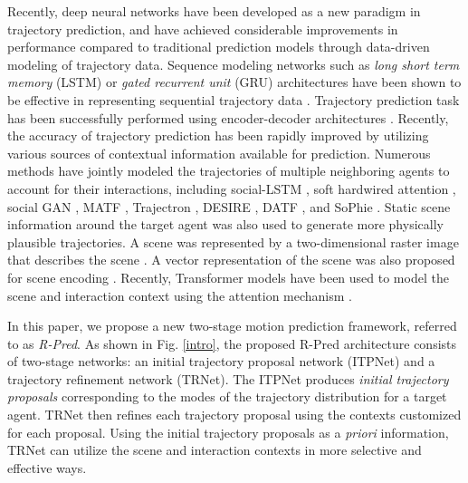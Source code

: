 \documentclass[10pt,twocolumn,letterpaper]{article}
\begin{document}
Recently, deep neural networks have been developed as a new paradigm in trajectory prediction, and have achieved considerable improvements in performance compared to traditional prediction models through data-driven modeling of trajectory data.  Sequence modeling networks such as {\it long short term memory} (LSTM) \cite{LSTM} or {\it gated recurrent unit} (GRU) \cite{GRU} architectures have been shown to be effective in representing sequential trajectory data \cite{LSTM_bdkim, LaPred}. Trajectory prediction task has been successfully performed using encoder-decoder architectures  \cite{seq2seq, TNT, LaneGCN, mmTransformer, THOMAS, DenseTNT, LTP, HiVT, multipath++, MHA-JAM, LaPred, gohome, autobot, PGP, convolutional-social-pooling, social-GAN, trajectron, trajectron++, desire, diverse-addmissible}.
Recently, the accuracy of trajectory prediction has been rapidly improved by utilizing various sources of contextual information available for prediction.  Numerous methods have jointly modeled the trajectories of multiple neighboring agents  to account for their interactions, including  social-LSTM \cite{social-lstm}, soft hardwired attention \cite{soft+hardwired-attention}, social GAN \cite{social-GAN}, MATF \cite{matp}, Trajectron \cite{trajectron, trajectron++}, DESIRE \cite{desire}, DATF \cite{diverse-addmissible}, and SoPhie \cite{sophie}. Static scene information around the target agent was also used to generate more physically plausible trajectories.
A scene was represented by a two-dimensional raster image that describes the scene  \cite{uncertainty, multipath, MTP, MHA-JAM, CoverNet, map-adaptive}. 
A vector representation of the scene was also proposed for scene encoding \cite{VectorNet, LaneGCN, TNT, DenseTNT, HiVT, LaPred, THOMAS, Scenetransformer, mmTransformer, PGP, LTP, GroupNet, adap_GNN}. Recently, Transformer models \cite{Transformer} have been used to model the scene and interaction context using the attention mechanism \cite{mmTransformer, Scenetransformer, HiVT, Wayformer, LTP, Agentformer}. 

In this paper, we propose a new two-stage motion prediction framework, referred to as {\it R-Pred}. As shown in Fig. \ref{intro}, the proposed R-Pred architecture consists of two-stage networks: an initial trajectory proposal network (ITPNet) and a trajectory refinement network (TRNet).  The ITPNet produces  {\it initial  trajectory proposals } corresponding to the  modes of the trajectory distribution for a target agent.  TRNet then refines each trajectory proposal using the contexts customized for each proposal.  Using the initial trajectory proposals as a {\it priori} information, TRNet can utilize the scene and interaction contexts in more selective and effective  ways.
\end{document}
